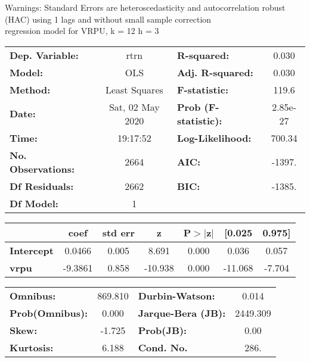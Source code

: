 Warnings: \newline
 [1] Standard Errors are heteroscedasticity and autocorrelation robust (HAC) using 1 lags and without small sample correction\\ 

regression model for VRPU, k = 12 h = 3\begin{center}
\begin{tabular}{lclc}
\toprule
\textbf{Dep. Variable:}    &       rtrn       & \textbf{  R-squared:         } &     0.030   \\
\textbf{Model:}            &       OLS        & \textbf{  Adj. R-squared:    } &     0.030   \\
\textbf{Method:}           &  Least Squares   & \textbf{  F-statistic:       } &     119.6   \\
\textbf{Date:}             & Sat, 02 May 2020 & \textbf{  Prob (F-statistic):} &  2.85e-27   \\
\textbf{Time:}             &     19:17:52     & \textbf{  Log-Likelihood:    } &    700.34   \\
\textbf{No. Observations:} &        2664      & \textbf{  AIC:               } &    -1397.   \\
\textbf{Df Residuals:}     &        2662      & \textbf{  BIC:               } &    -1385.   \\
\textbf{Df Model:}         &           1      & \textbf{                     } &             \\
\bottomrule
\end{tabular}
\begin{tabular}{lcccccc}
                   & \textbf{coef} & \textbf{std err} & \textbf{z} & \textbf{P$> |$z$|$} & \textbf{[0.025} & \textbf{0.975]}  \\
\midrule
\textbf{Intercept} &       0.0466  &        0.005     &     8.691  &         0.000        &        0.036    &        0.057     \\
\textbf{vrpu}      &      -9.3861  &        0.858     &   -10.938  &         0.000        &      -11.068    &       -7.704     \\
\bottomrule
\end{tabular}
\begin{tabular}{lclc}
\textbf{Omnibus:}       & 869.810 & \textbf{  Durbin-Watson:     } &    0.014  \\
\textbf{Prob(Omnibus):} &   0.000 & \textbf{  Jarque-Bera (JB):  } & 2449.309  \\
\textbf{Skew:}          &  -1.725 & \textbf{  Prob(JB):          } &     0.00  \\
\textbf{Kurtosis:}      &   6.188 & \textbf{  Cond. No.          } &     286.  \\
\bottomrule
\end{tabular}
\end{center}

